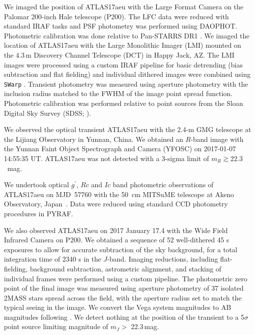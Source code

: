 \documentclass[twocolumn]{aastex6}
\begin{document}
We imaged the position of ATLAS17aeu with the Large Format Camera \citep[LFC;][]{sms+00} on the Palomar 200-inch Hale telescope (P200).  
The LFC data were reduced with standard IRAF tasks and PSF photometry was performed using DAOPHOT.  Photometric calibration was done relative to Pan-STARRS DR1 \citep{cmm+16,fmc+16}.
We imaged the location of ATLAS17aeu with the Large Monolithic Imager (LMI) mounted on the 4.3\,m Discovery Channel Telescope (DCT) in Happy Jack, AZ.  The LMI images were processed using a custom IRAF pipeline for basic detrending (bias subtraction and flat fielding) and individual dithered images were combined using \texttt{SWarp} \citep{bmr+02}.  Transient photometry was measured using aperture photometry with the inclusion radius matched to the FWHM of the image point spread function.  Photometric calibration was performed relative to point sources from the Sloan Digital Sky Survey (SDSS; \citealt{sdss16}).

We observed the optical transient ATLAS17aeu with the 2.4-m GMG
telescope at the Lijiang Observatory in Yunnan, China. We obtained an
$R$-band image with the Yunnan Faint Object Spectrograph and Camera
(YFOSC) on 2017-01-07 14:55:35 UT. ATLAS17aeu was not detected with a
3-sigma limit of $m_{R} \gtrsim 22.3$~mag.

We undertook optical $g^\prime$, $Rc$ and $Ic$ band photometric observations of ATLAS17aeu on MJD~57760 with the 50~cm MITSuME telescope at Akeno Observatory, Japan~\citep{mitsume}. Data were reduced using standard CCD photometry procedures in PYRAF.

We also observed ATLAS17aeu on 2017 January 17.4 with the Wide Field Infrared Camera \citep[WIRC;][]{weh+03} on P200. We obtained a sequence of 52 well-dithered 45 s exposures to allow for accurate subtraction of the sky background, for a total integration time of 2340 s in the $J$-band. Imaging reductions, including flat-fielding, background subtraction, astrometric alignment, and stacking of individual frames were performed using a custom pipeline. The photometric zero point of the final image was measured using aperture photometry of 37 isolated 2MASS stars spread across the field, with the aperture radius set to match the typical seeing in the image. We convert the Vega system magnitudes to AB magnitudes following \citet{br07}. We detect nothing at the position of the transient to a 5$\sigma$ point source limiting magnitude of $m_J >$ 22.3\,mag. 
\end{document}
